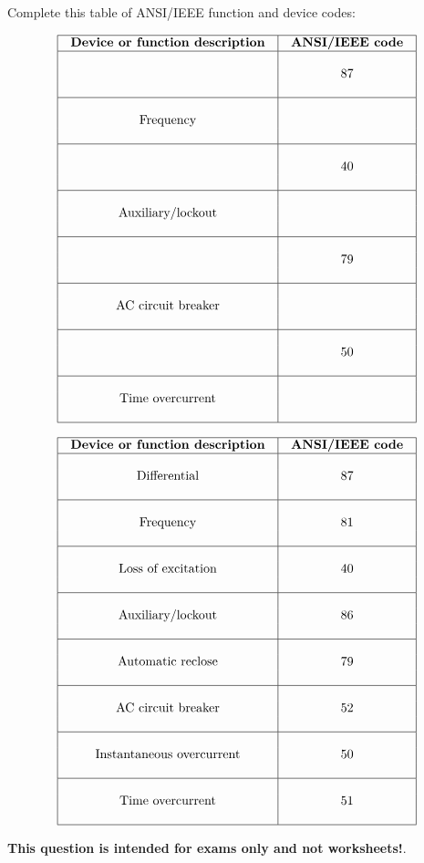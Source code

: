 

Complete this table of ANSI/IEEE function and device codes:


$$\vbox{\offinterlineskip
\halign{\strut
\vrule \quad\hfil # \ \hfil & 
\vrule \quad\hfil # \ \hfil \vrule \cr
\noalign{\hrule}
%
{\bf Device or function description} & {\bf ANSI/IEEE code} \cr
%
\noalign{\hrule}
%
 &  \cr
 & 87 \cr
 &  \cr
%
\noalign{\hrule}
%
 &  \cr
Frequency &  \cr
 &  \cr
%
\noalign{\hrule}
%
 &  \cr
 & 40 \cr
 &  \cr
%
\noalign{\hrule}
%
 &  \cr
Auxiliary/lockout &  \cr
 &  \cr
%
\noalign{\hrule}
%
 &  \cr
 & 79 \cr
 &  \cr
%
\noalign{\hrule}
%
 &  \cr
AC circuit breaker &  \cr
 &  \cr
%
\noalign{\hrule}
%
 &  \cr
 & 50 \cr
 &  \cr
%
\noalign{\hrule}
%
 &  \cr
Time overcurrent &  \cr
 &  \cr
%
\noalign{\hrule}
} %
}$$ %









$$\vbox{\offinterlineskip
\halign{\strut
\vrule \quad\hfil # \ \hfil & 
\vrule \quad\hfil # \ \hfil \vrule \cr
\noalign{\hrule}
%
{\bf Device or function description} & {\bf ANSI/IEEE code} \cr
%
\noalign{\hrule}
%
 &  \cr
Differential & 87 \cr
 &  \cr
%
\noalign{\hrule}
%
 &  \cr
Frequency & 81 \cr
 &  \cr
%
\noalign{\hrule}
%
 &  \cr
Loss of excitation & 40 \cr
 &  \cr
%
\noalign{\hrule}
%
 &  \cr
Auxiliary/lockout & 86 \cr
 &  \cr
%
\noalign{\hrule}
%
 &  \cr
Automatic reclose & 79 \cr
 &  \cr
%
\noalign{\hrule}
%
 &  \cr
AC circuit breaker & 52 \cr
 &  \cr
%
\noalign{\hrule}
%
 &  \cr
Instantaneous overcurrent & 50 \cr
 &  \cr
%
\noalign{\hrule}
%
 &  \cr
Time overcurrent & 51 \cr
 &  \cr
%
\noalign{\hrule}
} %
}$$ %







{\bf This question is intended for exams only and not worksheets!}.



